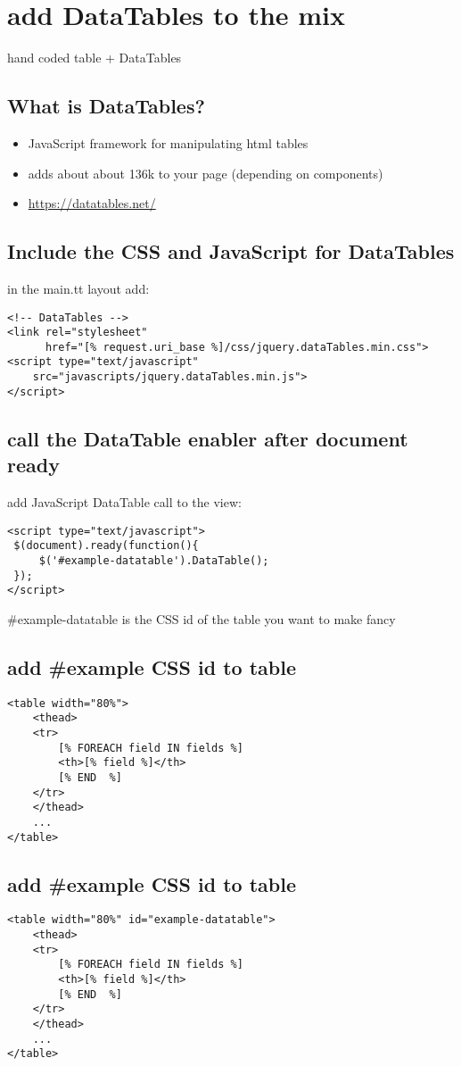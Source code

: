 \documentclass[11pt]{article}
\begin{document}
\section*{add DataTables to the mix}
\label{sec:orgheadline18}
hand coded table + DataTables
\subsection*{What is DataTables?}
\label{sec:orgheadline11}
\begin{itemize}
\item JavaScript framework for manipulating html tables
\item adds about about 136k to your page (depending on components)
\item \url{https://datatables.net/}
\end{itemize}
\subsection*{Include the CSS and JavaScript for DataTables}
\label{sec:orgheadline12}
in the main.tt layout add:
\begin{verbatim}
<!-- DataTables -->
<link rel="stylesheet" 
      href="[% request.uri_base %]/css/jquery.dataTables.min.css">
<script type="text/javascript" 
	src="javascripts/jquery.dataTables.min.js">
</script>
\end{verbatim}

\subsection*{call the DataTable enabler after document ready}
\label{sec:orgheadline13}
add JavaScript DataTable call to the view:
\begin{verbatim}
<script type="text/javascript">
 $(document).ready(function(){
     $('#example-datatable').DataTable();
 });
</script>
\end{verbatim}
\#example-datatable is the CSS id of the table you want to make fancy
\subsection*{add \#example CSS id to table}
\label{sec:orgheadline14}
\begin{verbatim}
<table width="80%">
    <thead>
	<tr>
	    [% FOREACH field IN fields %]
		<th>[% field %]</th>
	    [% END  %]
	</tr>
    </thead>
    ...
</table>
\end{verbatim}
\subsection*{add \#example CSS id to table}
\label{sec:orgheadline15}
\begin{verbatim}
<table width="80%" id="example-datatable">
    <thead>
	<tr>
	    [% FOREACH field IN fields %]
		<th>[% field %]</th>
	    [% END  %]
	</tr>
    </thead>
    ...
</table>
\end{verbatim}
\end{document}
